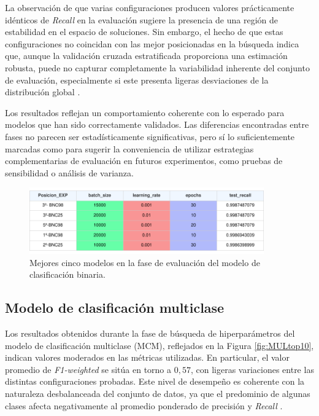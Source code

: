 La observación de que varias configuraciones producen valores prácticamente idénticos de \textit{Recall} en la evaluación sugiere la presencia de una región de estabilidad en el espacio de soluciones. Sin embargo, el hecho de que estas configuraciones no coincidan con las mejor posicionadas en la búsqueda indica que, aunque la validación cruzada estratificada proporciona una estimación robusta, puede no capturar completamente la variabilidad inherente del conjunto de evaluación, especialmente si este presenta ligeras desviaciones de la distribución global \cite{recht2019imagenet}.

Los resultados reflejan un comportamiento coherente con lo esperado para modelos que han sido correctamente validados. Las diferencias encontradas entre fases no parecen ser estadísticamente significativas, pero sí lo suficientemente marcadas como para sugerir la conveniencia de utilizar estrategias complementarias de evaluación en futuros experimentos, como pruebas de sensibilidad o análisis de varianza.

\begin{figure}[H]
    \centering
    \includegraphics[width=0.9\textwidth]{./img/evaluacion/resultados/top5EVALMCB.pdf}
    \caption{Mejores cinco modelos en la fase de evaluación del modelo de clasificación binaria.}
    \label{fig:top5EVALMCB}
\end{figure}

\subsection{Modelo de clasificación multiclase}

Los resultados obtenidos durante la fase de búsqueda de hiperparámetros del modelo de clasificación multiclase (MCM), reflejados en la Figura \ref{fig:MULtop10}, indican valores moderados en las métricas utilizadas. En particular, el valor promedio de \textit{F1-weighted} se sitúa en torno a $0{,}57$, con ligeras variaciones entre las distintas configuraciones probadas. Este nivel de desempeño es coherente con la naturaleza desbalanceada del conjunto de datos, ya que el predominio de algunas clases afecta negativamente al promedio ponderado de precisión y \textit{Recall} \cite{he2009learning}.

